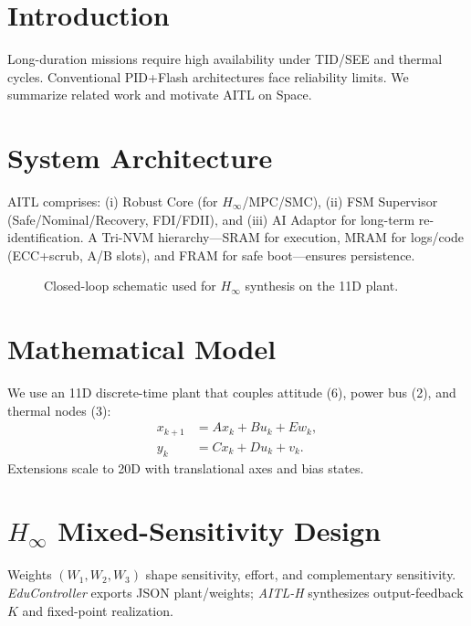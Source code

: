 \documentclass[conference]{IEEEtran}
\begin{document}
\FloatBarrier %

\section{Introduction}
Long-duration missions require high availability under TID/SEE and thermal cycles. Conventional PID{+}Flash architectures face reliability limits. We summarize related work and motivate AITL on Space.

\section{System Architecture}
AITL comprises: (i) Robust Core (for $H_\infty$/MPC/SMC), (ii) FSM Supervisor (Safe/Nominal/Recovery, FDI/FDII), and (iii) AI Adaptor for long-term re-identification. A Tri-NVM hierarchy---SRAM for execution, MRAM for logs/code (ECC{+}scrub, A/B slots), and FRAM for safe boot---ensures persistence.

\begin{figure}[t]
  \centering
  \caption{Closed-loop schematic used for $H_\infty$ synthesis on the 11D plant.}
  \label{fig:closedloop}
\end{figure}

\section{Mathematical Model}
We use an 11D discrete-time plant that couples attitude (6), power bus (2), and thermal nodes (3):
\begin{align}
  x_{k+1} &= A x_k + B u_k + E w_k,\\
  y_k &= C x_k + D u_k + v_k .
\end{align}
Extensions scale to 20D with translational axes and bias states.

\section{$H_\infty$ Mixed-Sensitivity Design}
Weights $(W_1,W_2,W_3)$ shape sensitivity, effort, and complementary sensitivity. \textit{EduController} exports JSON plant/weights; \textit{AITL-H} synthesizes output-feedback $K$ and fixed-point realization.
\end{document}
